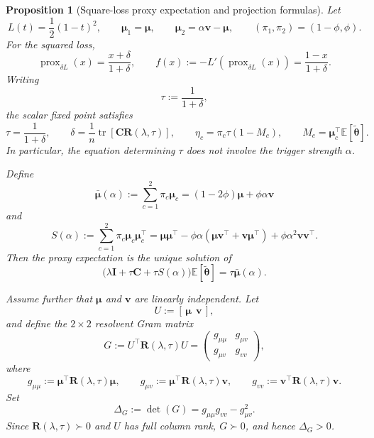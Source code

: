 \documentclass[11pt]{article}
\DeclareMathOperator{\tr}{tr}
\DeclareMathOperator{\prox}{prox}
\newcommand{\EE}{\mathbb{E}}
\newcommand{\I}{\mathbf{I}}
\newcommand{\C}{\mathbf{C}}
\newcommand{\bv}{\mathbf{v}}
\newcommand{\bmu}{\boldsymbol{\mu}}
\newcommand{\btheta}{\boldsymbol{\theta}}
\newtheorem{proposition}[theorem]{Proposition}
\begin{document}
\begin{proposition}[Square-loss proxy expectation and projection formulas]
\label{prop:lin_exact_projections}
Let
\[
L(t)=\frac12(1-t)^2,
\qquad
\bmu_1=\bmu,
\qquad
\bmu_2=\alpha\bv-\bmu,
\qquad
(\pi_1,\pi_2)=(1-\phi,\phi).
\]
For the squared loss,
\[
\prox_{\delta L}(x)=\frac{x+\delta}{1+\delta},
\qquad
f(x):=-L'(\prox_{\delta L}(x))=\frac{1-x}{1+\delta}.
\]
Writing
\[
\tau:=\frac{1}{1+\delta},
\]
the scalar fixed point satisfies
\begin{equation}
\label{eq:lin_tau_eta}
\tau=\frac{1}{1+\delta},
\qquad
\delta=\frac1n\tr\!\left[\C \mathbf{R}(\lambda,\tau)\right],
\qquad
\eta_c=\pi_c\tau(1-M_c),
\qquad
M_c=\bmu_c^\top\EE[\tilde{\btheta}].
\end{equation}
In particular, the equation determining \(\tau\) does not involve the trigger
strength \(\alpha\).

Define
\begin{equation}
\label{eq:lin_mubar}
\bar{\bmu}(\alpha)
:=
\sum_{c=1}^2\pi_c\bmu_c
=
(1-2\phi)\bmu+\phi\alpha\bv
\end{equation}
and
\begin{equation}
\label{eq:lin_S}
S(\alpha)
:=
\sum_{c=1}^2\pi_c\bmu_c\bmu_c^\top
=
\bmu\bmu^\top
-\phi\alpha(\bmu\bv^\top+\bv\bmu^\top)
+\phi\alpha^2\bv\bv^\top .
\end{equation}
Then the proxy expectation is the unique solution of
\begin{equation}
\label{eq:lin_master}
\bigl(\lambda\I+\tau\C+\tau S(\alpha)\bigr)\EE[\tilde{\btheta}]
=
\tau\bar{\bmu}(\alpha).
\end{equation}

Assume further that \(\bmu\) and \(\bv\) are linearly independent. Let
\[
U:=[\,\bmu\ \ \bv\,],
\]
and define the \(2\times2\) resolvent Gram matrix
\[
G:=U^\top \mathbf{R}(\lambda,\tau) U
=
\begin{pmatrix}
g_{\mu\mu} & g_{\mu v}\\
g_{\mu v} & g_{vv}
\end{pmatrix},
\]
where
\[
g_{\mu\mu}:=\bmu^\top \mathbf{R}(\lambda,\tau)\bmu,
\qquad
g_{\mu v}:=\bmu^\top \mathbf{R}(\lambda,\tau)\bv,
\qquad
g_{vv}:=\bv^\top \mathbf{R}(\lambda,\tau)\bv .
\]
Set
\[
\Delta_G:=\det(G)=g_{\mu\mu}g_{vv}-g_{\mu v}^2.
\]
Since \(\mathbf{R}(\lambda,\tau)\succ0\) and \(U\) has full column rank, \(G\succ0\),
and hence \(\Delta_G>0\).


\end{proposition}
\end{document}
